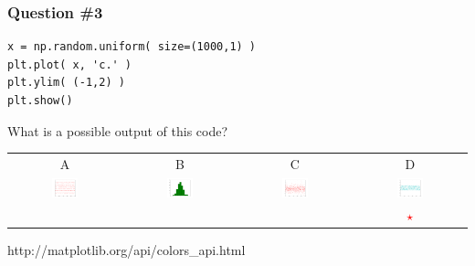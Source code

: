 \documentclass[11pt]{beamer}
\newcommand{\correctstar}{\textcolor{red}{$\star$}}
\begin{document}
\begin{frame}[fragile]
  \frametitle{Question \#3}
  \Enlarge

  \begin{Verbatim}
x = np.random.uniform( size=(1000,1) )
plt.plot( x, 'c.' )
plt.ylim( (-1,2) )
plt.show()
  \end{Verbatim}

  What is a possible output of this code?

  \begin{center}
  \begin{tabular}{cccc}
    A & B & C & D \\
    \includegraphics[width=0.25\textwidth]{./img/figure_2.png}
    &
    \includegraphics[width=0.25\textwidth]{./img/figure_3.png}
    &
    \includegraphics[width=0.25\textwidth]{./img/figure_4.png}
    &
    \includegraphics[width=0.25\textwidth]{./img/figure_5.png}
    \\
    & & & \correctstar \\
    
  \end{tabular}
    http://matplotlib.org/api/colors\_api.html
  \end{center}
\end{frame}

\end{document}
